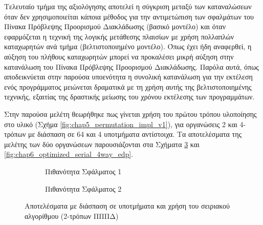 Τελευταίο τμήμα της αξιολόγησης αποτελεί η σύγκριση μεταξύ των καταναλώσεων όταν δεν χρησιμοποιείται κάποια μέθοδος για την αντιμετώπιση των σφαλμάτων του Πίνακα Πρόβλεψης Προορισμού Διακλάδωσης (βασικό μοντέλο) και όταν εφαρμόζεται η τεχνική της λογικής μετάθεσης πλαισίων με χρήση πολλαπλών καταχωρητών ανά τμήμα (βελτιστοποιημένο μοντέλο). Όπως έχει ήδη αναφερθεί, η αύξηση του πλήθους καταχωρητών μπορεί να προκαλέσει μικρή αύξηση στην κατανάλωση του Πίνακα Πρόβλεψης Προορισμού Διακλάδωσης. Παρόλα αυτά, όπως αποδεικνύεται στην παρούσα υποενότητα η συνολική κατανάλωση για την εκτέλεση ενός προγράμματος μειώνεται δραματικά με τη χρήση αυτής της βελτιστοποιημένης τεχνικής, εξαιτίας της δραστικής μείωσης του χρόνου εκτέλεσης των προγραμμάτων.
\par
Στην παρούσα μελέτη θεωρήθηκε πως γίνεται χρήση του πρώτου τρόπου υλοποίησης στο υλικό (Σχήμα \ref{fig:chap5_permutation_impl_v1}), για οργανώσεις 2 και 4-τρόπων με διάσπαση σε 64 και 4 υποτμήματα αντίστοιχα. Τα αποτελέσματα της μελέτης των δύο οργανώσεων παρουσιάζονται στα Σχήματα \ref{fig:chap6_optimized_serial_2way_edp} και \ref{fig:chap6_optimized_serial_4way_edp}.

\begin{figure}[!t]
    \centering
    \begin{subfigure}[t]{\textwidth}
        \centering
        \caption{Πιθανότητα Σφάλματος 1}
        \label{fig:chap6_optimized_serial_2way_pail1_edp}
    \end{subfigure}
    
    \begin{subfigure}[t]{\textwidth}
        \centering
        \caption{Πιθανότητα Σφάλματος 2}
        \label{fig:chap6_optimized_serial_2way_pail2_edp}
    \end{subfigure}
    
    \caption{Αποτελέσματα με διάσπαση σε υποτμήματα και χρήση του σειριακού αλγορίθμου (2-τρόπων ΠΠΠΔ)}
    \label{fig:chap6_optimized_serial_2way_edp}
\end{figure}

